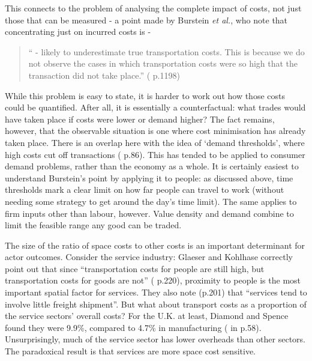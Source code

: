 {This connects to the problem of analysing the complete impact of costs, not just those that can be measured - a point made by Burstein \emph{et al.}, who note that concentrating just on incurred costs is - 

\begin{quote}
`` - likely to underestimate true transportation costs. This is because we do not observe the cases in which transportation costs were so high that the transaction did not take place.'' (\citealt{burstein_distribution_2003} p.1198)
\end{quote}

While this problem is easy to state, it is harder to work out how those costs could be quantified. After all, it is essentially a counterfactual: what trades would have taken place if costs were lower or demand higher? The fact remains, however, that the observable situation is one where cost minimisation has already taken place. There is an overlap here with the idea of `demand thresholds', where high costs cut off transactions (\citealt{chapman_people_1979} p.86).  This has tended to be applied to consumer demand problems, rather than the economy as a whole. It is certainly easiest to understand Burstein's point by applying it to people: as discussed above, time thresholds mark a clear limit on how far people can travel to work (without needing some strategy to get around the day's time limit). The same applies to firm inputs other than labour, however. Value density and demand combine to limit the feasible range any good can be traded. 


The size of the ratio of space costs to other costs is an important determinant for actor outcomes. Consider the service industry: Glaeser and Kohlhase correctly point out that since ``transportation costs for people are still high, but transportation costs for goods are not'' (\citealt{glaeser_cities_2004} p.220), proximity to people is the most important spatial factor for services. They also note (p.201) that ``services tend to involve little freight shipment''. But what about transport costs as a proportion of the service sectors' overall costs? For the U.K. at least, Diamond and Spence found they were 9.9\%, compared to 4.7\% in manufacturing (\citealt{diamond_infrastructure_1989} in \citealt{button_transport_2010} p.58). Unsurprisingly, much of the service sector has lower overheads than other sectors. The paradoxical result is that services are more space cost sensitive. 

}
